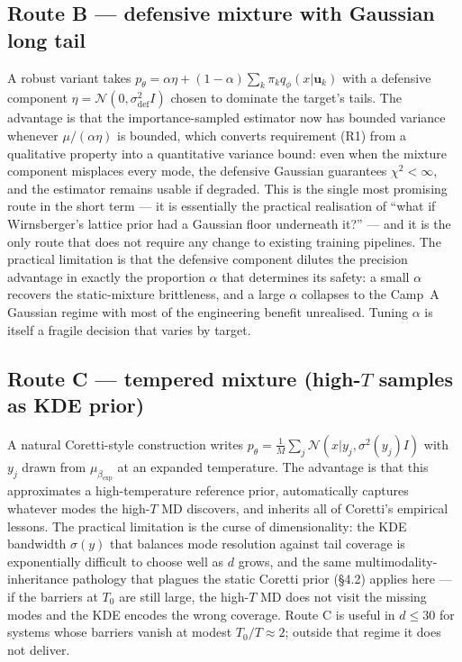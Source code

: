 \documentclass[11pt,letterpaper]{article}
\theoremstyle{plain}
\begin{document}
\subsection{Route B --- defensive mixture with Gaussian long tail}

A robust variant takes
$p_\theta = \alpha\eta + (1-\alpha)\sum_k\pi_k q_\phi(x|\mathbf u_k)$ with a
defensive component $\eta=\mathcal N(0,\sigma_{\mathrm{def}}^2 I)$ chosen
to dominate the target's tails. The advantage is that the
importance-sampled estimator now has bounded variance whenever
$\mu/(\alpha\eta)$ is bounded, which converts requirement (R1) from a
qualitative property into a quantitative variance bound: even when the
mixture component misplaces every mode, the defensive Gaussian guarantees
$\chi^2 < \infty$, and the estimator remains usable if degraded. This is
the single most promising route in the short term --- it is essentially the
practical realisation of ``what if Wirnsberger's lattice prior had a
Gaussian floor underneath it?'' --- and it is the only route that does not
require any change to existing training pipelines. The practical
limitation is that the defensive component dilutes the precision advantage
in exactly the proportion $\alpha$ that determines its safety: a small
$\alpha$ recovers the static-mixture brittleness, and a large $\alpha$
collapses to the Camp~A Gaussian regime with most of the engineering
benefit unrealised. Tuning $\alpha$ is itself a fragile decision that
varies by target.

\subsection{Route C --- tempered mixture (high-$T$ samples as KDE prior)}

A natural Coretti-style construction writes
$p_\theta = \frac{1}{M}\sum_j \mathcal N(x|y_j,\sigma^2(y_j)I)$ with
$y_j$ drawn from $\mu_{\beta_{\mathrm{exp}}}$ at an expanded temperature.
The advantage is that this approximates a high-temperature reference
prior, automatically captures whatever modes the high-$T$ MD discovers,
and inherits all of Coretti's empirical lessons. The practical limitation
is the curse of dimensionality: the KDE bandwidth $\sigma(y)$ that
balances mode resolution against tail coverage is exponentially difficult
to choose well as $d$ grows, and the same multimodality-inheritance
pathology that plagues the static Coretti prior (\S4.2) applies here ---
if the barriers at $T_0$ are still large, the high-$T$ MD does not visit
the missing modes and the KDE encodes the wrong coverage. Route C is
useful in $d\leq 30$ for systems whose barriers vanish at modest
$T_0/T\approx 2$; outside that regime it does not deliver.
\end{document}
